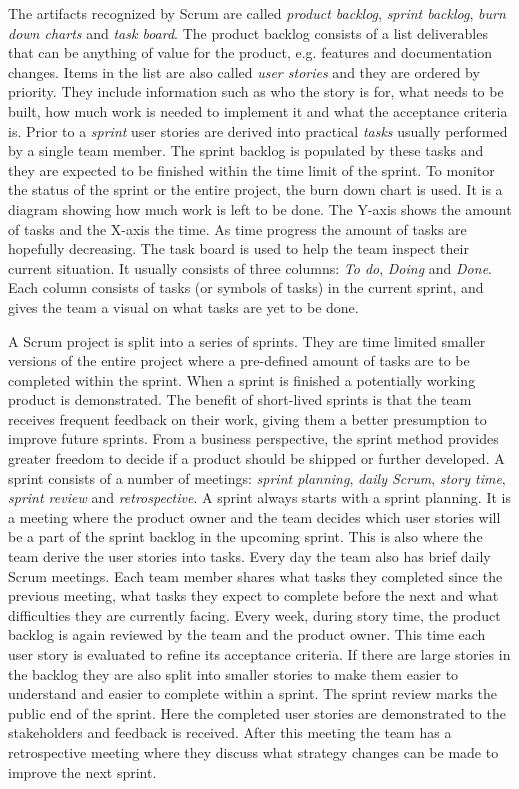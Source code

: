 The artifacts recognized by Scrum are called \textit{product backlog},
\textit{sprint backlog}, \textit{burn down charts} and \textit{task board}. The
product backlog consists of a list deliverables that can be anything of value
for the product, e.g. features and documentation changes. Items in the list are
also called \textit{user stories} and they are ordered by priority. They
include information such as who the story is for, what needs to be built, how
much work is needed to implement it and what the acceptance criteria is. Prior
to a \textit{sprint} user stories are derived into practical \textit{tasks}
usually performed by a single team member. The sprint backlog is populated by
these tasks and they are expected to be finished within the time limit of the
sprint. To monitor the status of the sprint or the entire project, the burn
down chart is used. It is a diagram showing how much work is left to be done.
The Y-axis shows the amount of tasks and the X-axis the time. As time progress
the amount of tasks are hopefully decreasing. The task board is used to help
the team inspect their current situation. It usually consists of three columns:
\textit{To do}, \textit{Doing} and \textit{Done}. Each column consists of tasks
(or symbols of tasks) in the current sprint, and gives the team a visual on
what tasks are yet to be done. \cite{sims2012scrum}

A Scrum project is split into a series of sprints. They are time limited
smaller versions of the entire project where a pre-defined amount of tasks are
to be completed within the sprint. When a sprint is finished a potentially
working product is demonstrated. The benefit of short-lived sprints is that the
team receives frequent feedback on their work, giving them a better presumption
to improve future sprints. From a business perspective, the sprint method
provides greater freedom to decide if a product should be shipped or further
developed. A sprint consists of a number of meetings: \textit{sprint planning},
\textit{daily Scrum}, \textit{story time}, \textit{sprint review} and
\textit{retrospective}. A sprint always starts with a sprint planning. It is a
meeting where the product owner and the team decides which user stories will be
a part of the sprint backlog in the upcoming sprint. This is also where the
team derive the user stories into tasks. Every day the team also has brief
daily Scrum meetings. Each team member shares what tasks they completed since
the previous meeting, what tasks they expect to complete before the next and
what difficulties they are currently facing. Every week, during story time, the
product backlog is again reviewed by the team and the product owner. This time
each user story is evaluated to refine its acceptance criteria. If there are
large stories in the backlog they are also split into smaller stories to make
them easier to understand and easier to complete within a sprint. The sprint
review marks the public end of the sprint. Here the completed user stories are
demonstrated to the stakeholders and feedback is received. After this meeting
the team has a retrospective meeting where they discuss what strategy changes
can be made to improve the next sprint. \cite{sims2012scrum}

